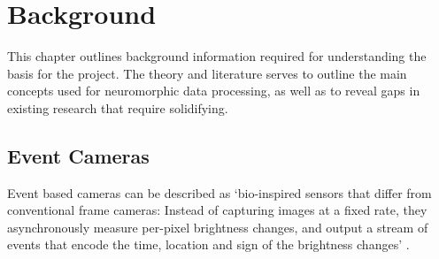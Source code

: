 \chapter{Background} \label{chap:background}



This chapter outlines background information required for understanding the basis for the project. The theory and literature serves to outline the main concepts used for neuromorphic data processing, as well as to reveal gaps in existing research that require solidifying.

\section{Event Cameras}

Event based cameras can be described as `bio-inspired sensors that differ from conventional frame cameras: Instead of capturing images at a fixed rate, they asynchronously measure per-pixel brightness changes, and output a stream of events that encode the time, location and sign of the brightness changes' \cite{EventBasedVisionASurvery}.

